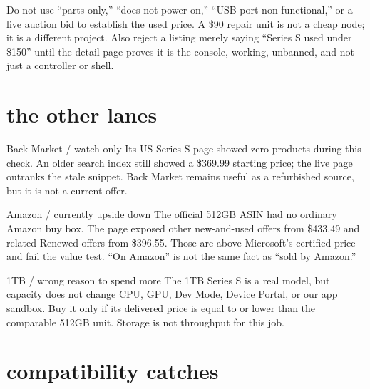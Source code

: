 \documentclass[10pt,letterpaper]{article}
\begin{document}
\begin{gearwarning}
Do not use ``parts only,'' ``does not power on,'' ``USB port non-functional,''
or a live auction bid to establish the used price. A \$90 repair unit is not a
cheap node; it is a different project. Also reject a listing merely saying
``Series S used under \$150'' until the detail page proves it is the console,
working, unbanned, and not just a controller or shell.
\end{gearwarning}

\section{the other lanes}

\begin{gearcard}{Back Market / watch only}
Its US Series S page showed zero products during this check. An older search
index still showed a \$369.99 starting price; the live page outranks the stale
snippet. Back Market remains useful as a refurbished source, but it is not a
current offer.
\end{gearcard}

\begin{gearcard}{Amazon / currently upside down}
The official 512GB ASIN had no ordinary Amazon buy box. The page exposed other
new-and-used offers from \$433.49 and related Renewed offers from \$396.55.
Those are above Microsoft's certified price and fail the value test. ``On
Amazon'' is not the same fact as ``sold by Amazon.''
\end{gearcard}

\begin{gearcard}{1TB / wrong reason to spend more}
The 1TB Series S is a real model, but capacity does not change CPU, GPU, Dev
Mode, Device Portal, or our app sandbox. Buy it only if its delivered price is
equal to or lower than the comparable 512GB unit. Storage is not throughput for
this job.
\end{gearcard}

\section{compatibility catches}
\end{document}
